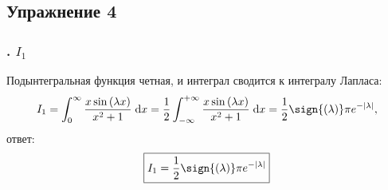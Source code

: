 \def \picdir{pic/}

\subsection*{Упражнение 4}
\subsubsection*{. $I_1$}
Подынтегральная функция четная, и интеграл сводится к интегралу Лапласа:
\begin{equation*}
I_1 = \int_{0}^{\infty} \frac{x\sin{(\lambda x)}}{x^2+1}\; \mathrm{d} x = \frac{1}{2}\int_{-\infty}^{+\infty} \frac{x\sin{(\lambda x)}}{x^2+1}\; \mathrm{d} x = \frac{1}{2}\sign{(\lambda)} \pi e^{-|\lambda|},
\end{equation*}
ответ:
\begin{equation*}
\boxed{I_1 = \frac{1}{2}\sign{(\lambda)}\pi e^{-|\lambda|}}
\end{equation*}

